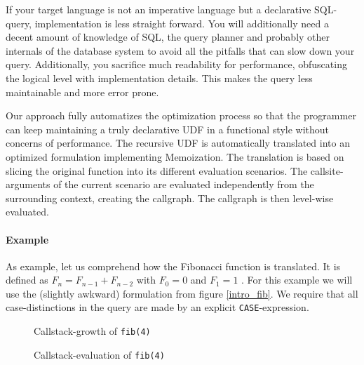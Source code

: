 If your target language is not an imperative language but a declarative SQL-query, implementation is less straight forward. You will additionally need a decent amount of knowledge of SQL, the query planner and probably other internals of the database system to avoid all the pitfalls that can slow down your query. Additionally, you sacrifice much readability for performance, obfuscating the logical level with implementation details. This makes the query less maintainable and more error prone.

Our approach fully automatizes the optimization process so that the programmer can keep maintaining a truly declarative UDF in a functional style without concerns of performance. The recursive UDF is automatically translated into an optimized formulation implementing Memoization. The translation is based on slicing the original function into its different evaluation scenarios. The callsite-arguments of the current scenario are evaluated independently from the surrounding context, creating the callgraph. The callgraph is then level-wise evaluated.

\paragraph*{Example}

As example, let us comprehend how the Fibonacci function is translated. It is defined as $F_n = F_{n-1} + F_{n-2}$ with $F_0 = 0$ and $F_1 = 1$ \cite[p. 79]{TAOCP_Knuth}. For this example we will use the (slightly awkward) formulation from figure \autoref{intro_fib}. We require that all case-distinctions in the query are made by an explicit \texttt{CASE}-expression.

\begin{figure}[h]\small
    \begin{minipage}[b]{.47\linewidth}
        
        \caption{Callstack-growth of \texttt{fib(4)}}
        \label{fib_4_callstack}
    \end{minipage}\hfill
    \begin{minipage}[b]{.5\linewidth}
    
        \caption{Callstack-evaluation of \texttt{fib(4)}}
        \label{fib_4_callstack_evaluation}
    \end{minipage}
\end{figure}

